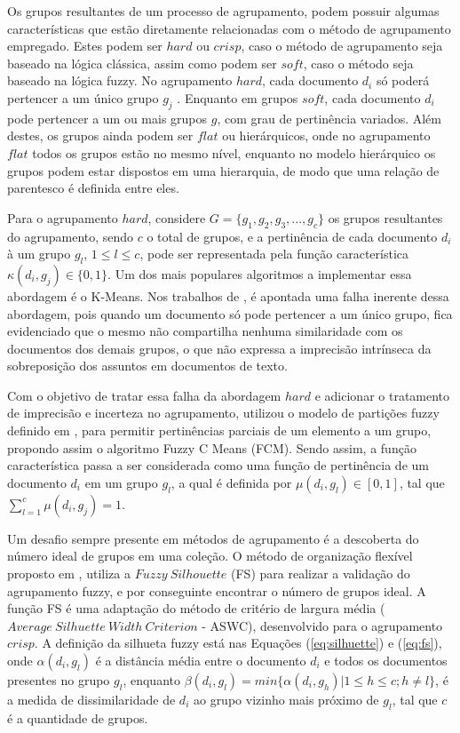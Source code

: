 Os grupos resultantes de um  processo de agrupamento, podem possuir algumas características que
estão diretamente relacionadas com o método de agrupamento empregado. Estes podem ser $hard$ ou
$crisp$, caso o método de agrupamento seja baseado na lógica clássica, assim como podem ser $soft$,
caso o método seja baseado na lógica fuzzy. No agrupamento $hard$, cada documento $d_{i}$ só poderá
pertencer a um único grupo $g_{j}$ \cite{Bezdek1984}. Enquanto em grupos $soft$, cada documento
$d_{i}$ pode pertencer a um ou mais grupos $g$, com grau de pertinência variados.  Além destes, os
grupos ainda podem ser $flat$ ou hierárquicos, onde no agrupamento $flat$ todos os grupos estão no
mesmo nível, enquanto no modelo hierárquico os grupos podem estar dispostos em uma hierarquia, de
modo que uma relação de parentesco é definida entre eles.

Para o agrupamento $hard$, considere $G = \{g_{1},g_{2},g_{3},...,g_{c}\}$ os grupos resultantes do
agrupamento, sendo $c$ o total de grupos, e a pertinência de cada documento $d_{i}$ à um grupo
$g_{l}$, $1 \leq l \leq c$, pode ser representada pela função característica $\kappa(d_{i}, g_{j})
\in \{0,1\}$.  Um dos mais populares algoritmos a implementar essa abordagem é o K-Means. Nos
trabalhos de , é apontada uma falha inerente dessa
abordagem, pois quando um documento só pode pertencer a um único grupo, fica evidenciado que o mesmo
não compartilha nenhuma similaridade com os documentos dos demais grupos, o que não expressa a
imprecisão intrínseca da sobreposição dos assuntos em documentos de texto.

Com o objetivo de tratar essa falha da abordagem $hard$ e adicionar o tratamento de imprecisão e
incerteza no agrupamento,  utilizou o modelo de partições fuzzy definido em
, para permitir pertinências parciais de um elemento a um grupo, propondo
assim o algoritmo Fuzzy C Means (FCM).  Sendo assim, a função característica passa a ser considerada
como uma função de pertinência de um documento $d_{i}$ em um grupo $g_{l}$, a qual é definida por
$\mu(d_{i}, g_{l}) \in [0,1]$, tal que $\sum_{l=1}^c \mu(d_{i}, g_{j}) = 1$.

Um desafio sempre presente em métodos de agrupamento é a descoberta do número ideal de grupos em uma
coleção. O método de organização flexível proposto em , utiliza a  $Fuzzy\
Silhouette$ (FS) para realizar a validação do agrupamento fuzzy, e por conseguinte encontrar o
número de grupos ideal. A função FS é uma adaptação do método de critério de largura média
($Average\ Silhuette\ Width\ Criterion$ - ASWC), desenvolvido para o agrupamento $crisp$. A
definição da silhueta fuzzy está nas Equações (\ref{eq:silhuette}) e (\ref{eq:fs}), onde
$\alpha(d_i, g_l)$ é a distância média entre o documento $d_i$ e todos os documentos presentes no
grupo $g_l$, enquanto $\beta(d_i,g_l) = min\{\alpha(d_i,g_h) | 1 \leq h \leq c; h \neq l\}$, é a
medida de dissimilaridade de $d_i$ ao grupo vizinho mais próximo de $g_l$, tal que $c$ é a
quantidade de grupos.  


